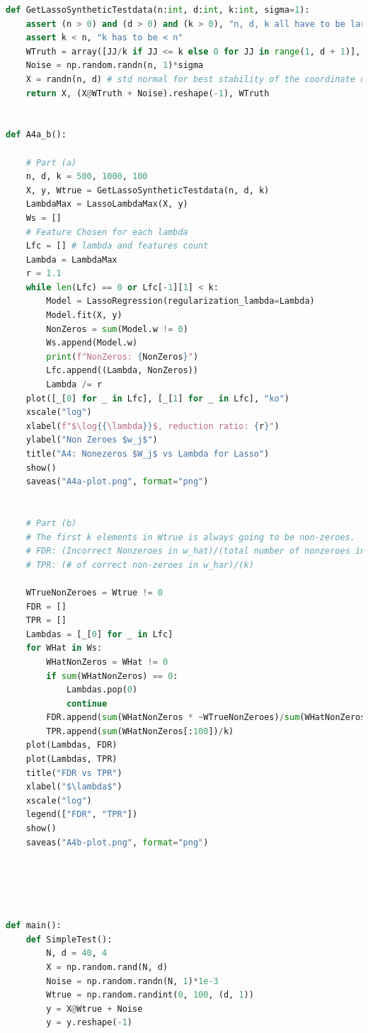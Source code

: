 \documentclass[]{article}
\begin{document}
\begin{lstlisting}[language=python]
def GetLassoSyntheticTestdata(n:int, d:int, k:int, sigma=1):
    assert (n > 0) and (d > 0) and (k > 0), "n, d, k all have to be larger than zeros"
    assert k < n, "k has to be < n"
    WTruth = array([JJ/k if JJ <= k else 0 for JJ in range(1, d + 1)], dtype=np.float)[:, np.newaxis]
    Noise = np.random.randn(n, 1)*sigma
    X = randn(n, d) # std normal for best stability of the coordinate descend algorithm.
    return X, (X@WTruth + Noise).reshape(-1), WTruth


def A4a_b():

    # Part (a)
    n, d, k = 500, 1000, 100
    X, y, Wtrue = GetLassoSyntheticTestdata(n, d, k)
    LambdaMax = LassoLambdaMax(X, y)
    Ws = []
    # Feature Chosen for each lambda
    Lfc = [] # lambda and features count
    Lambda = LambdaMax
    r = 1.1
    while len(Lfc) == 0 or Lfc[-1][1] < k:
        Model = LassoRegression(regularization_lambda=Lambda)
        Model.fit(X, y)
        NonZeros = sum(Model.w != 0)
        Ws.append(Model.w)
        print(f"NonZeros: {NonZeros}")
        Lfc.append((Lambda, NonZeros))
        Lambda /= r
    plot([_[0] for _ in Lfc], [_[1] for _ in Lfc], "ko")
    xscale("log")
    xlabel(f"$\log{{\lambda}}$, reduction ratio: {r}")
    ylabel("Non Zeroes $w_j$")
    title("A4: Nonezeros $W_j$ vs Lambda for Lasso")
    show()
    saveas("A4a-plot.png", format="png")


    # Part (b)
    # The first k elements in Wtrue is always going to be non-zeroes.
    # FDR: (Incorrect Nonzeroes in w_hat)/(total number of nonzeroes in w_hat)
    # TPR: (# of correct non-zeroes in w_har)/(k)

    WTrueNonZeroes = Wtrue != 0
    FDR = []
    TPR = []
    Lambdas = [_[0] for _ in Lfc]
    for WHat in Ws:
        WHatNonZeros = WHat != 0
        if sum(WHatNonZeros) == 0:
            Lambdas.pop(0)
            continue
        FDR.append(sum(WHatNonZeros * ~WTrueNonZeroes)/sum(WHatNonZeros))
        TPR.append(sum(WHatNonZeros[:100])/k)
    plot(Lambdas, FDR)
    plot(Lambdas, TPR)
    title("FDR vs TPR")
    xlabel("$\lambda$")
    xscale("log")
    legend(["FDR", "TPR"])
    show()
    saveas("A4b-plot.png", format="png")





def main():
    def SimpleTest():
        N, d = 40, 4
        X = np.random.rand(N, d)
        Noise = np.random.randn(N, 1)*1e-3
        Wtrue = np.random.randint(0, 100, (d, 1))
        y = X@Wtrue + Noise
        y = y.reshape(-1)


\end{lstlisting}
\end{document}
